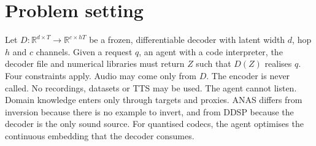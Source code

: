 \documentclass[10pt,twocolumn]{article}
\begin{document}
\section{Problem setting}
Let $D:\mathbb{R}^{d\times T}\!\to\!\mathbb{R}^{c\times hT}$ be a frozen, differentiable decoder with latent width $d$, hop $h$ and $c$ channels. Given a request $q$, an agent with a code interpreter, the decoder file and numerical libraries must return $Z$ such that $D(Z)$ realises $q$. Four constraints apply. Audio may come only from $D$. The encoder is never called. No recordings, datasets or TTS may be used. The agent cannot listen. Domain knowledge enters only through targets and proxies. ANAS differs from inversion \cite{xia2022gan} because there is no example to invert, and from DDSP \cite{engel2020ddsp} because the decoder is the only sound source. For quantised codecs, the agent optimises the continuous embedding that the decoder consumes.
\end{document}
